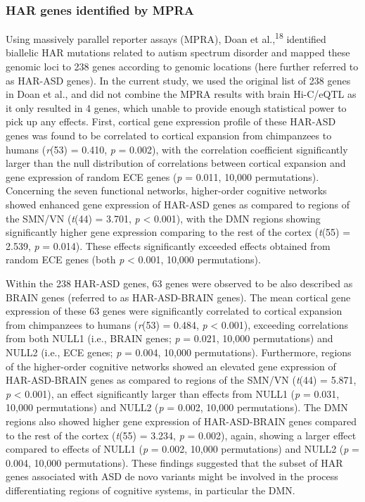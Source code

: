 \begin{refsection}
\subsubsection{HAR genes identified by MPRA}
Using massively parallel reporter assays (MPRA), Doan et al.,\textsuperscript{18} identified biallelic HAR mutations related to autism spectrum disorder and mapped these genomic loci to 238 genes according to genomic locations (here further referred to as HAR-ASD genes). In the current study, we used the original list of 238 genes in Doan et al., and did not combine the MPRA results with brain Hi-C/eQTL as it only resulted in 4 genes, which unable to provide enough statistical power to pick up any effects. First, cortical gene expression profile of these HAR-ASD genes was found to be correlated to cortical expansion from chimpanzees to humans (\textit{r}(53) = 0.410, \textit{p} = 0.002), with the correlation coefficient significantly larger than the null distribution of correlations between cortical expansion and gene expression of random ECE genes (\textit{p} = 0.011, 10,000 permutations). Concerning the seven functional networks, higher-order cognitive networks showed enhanced gene expression of HAR-ASD genes as compared to regions of the SMN/VN (\textit{t}(44) = 3.701, \textit{p} < 0.001), with the DMN regions showing significantly higher gene expression comparing to the rest of the cortex (\textit{t}(55) = 2.539, \textit{p} = 0.014). These effects significantly exceeded effects obtained from random ECE genes (both \textit{p} < 0.001, 10,000 permutations).

 Within the 238 HAR-ASD genes, 63 genes were observed to be also described as BRAIN genes (referred to as HAR-ASD-BRAIN genes). The mean cortical gene expression of these 63 genes were significantly correlated to cortical expansion from chimpanzees to humans (\textit{r}(53) = 0.484, \textit{p} < 0.001), exceeding correlations from both NULL1 (i.e., BRAIN genes; \textit{p} = 0.021, 10,000 permutations) and NULL2 (i.e., ECE genes; \textit{p} = 0.004, 10,000 permutations). Furthermore, regions of the higher-order cognitive networks showed an elevated gene expression of HAR-ASD-BRAIN genes as compared to regions of the SMN/VN (\textit{t}(44) = 5.871, \textit{p} < 0.001), an effect significantly larger than effects from NULL1 (\textit{p} = 0.031, 10,000 permutations) and NULL2 (\textit{p} = 0.002, 10,000 permutations). The DMN regions also showed higher gene expression of HAR-ASD-BRAIN genes compared to the rest of the cortex (\textit{t}(55) = 3.234, \textit{p} = 0.002), again, showing a larger effect compared to effects of NULL1 (\textit{p} = 0.002, 10,000 permutations) and NULL2 (\textit{p} = 0.004, 10,000 permutations). These findings suggested that the subset of HAR genes associated with ASD de novo variants might be involved in the process differentiating regions of cognitive systems, in particular the DMN.


\end{refsection}
